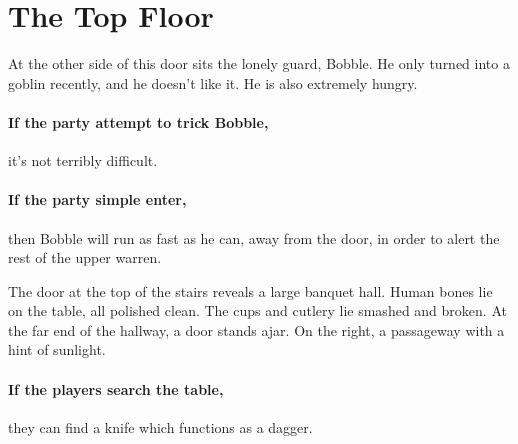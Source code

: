 \section{The Top Floor}
\label{upper}

\setcounter{list}{0}

\begin{multicols}{2}


\begin{figure*}[b!]


\end{figure*}

At the other side of this door sits the lonely guard, Bobble.
He only turned into a goblin recently, and he doesn't like it.
He is also extremely hungry.

\paragraph{If the party attempt to trick Bobble,}
it's not terribly difficult.

\paragraph{If the party simple enter,}
then Bobble will run as fast as he can, away from the door, in order to alert the rest of the upper warren.



\begin{boxtext}

	The door at the top of the stairs reveals a large banquet hall.
	Human bones lie on the table, all polished clean.
	The cups and cutlery lie smashed and broken.
	At the far end of the hallway, a door stands ajar.
	On the right, a passageway with a hint of sunlight.

\end{boxtext}

\paragraph{If the players search the table,}
they can find a knife which functions as a dagger.


\begin{boxtext}


\end{boxtext}
\end{multicols}
